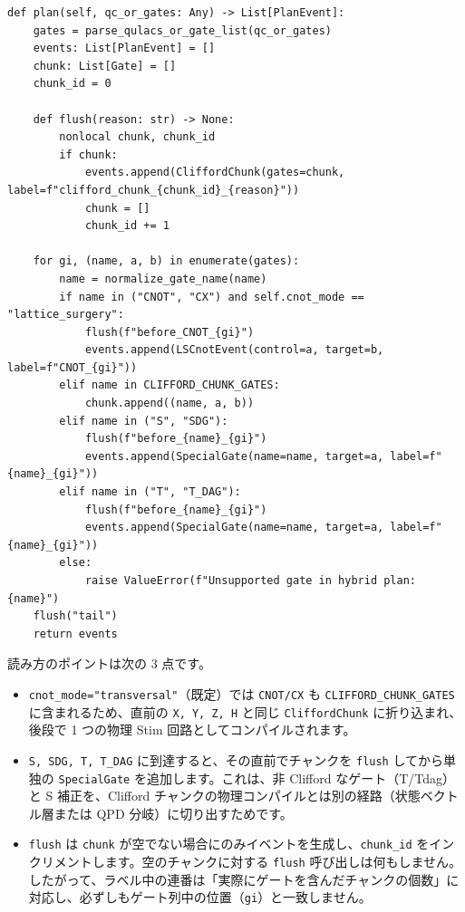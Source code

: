 \begin{lstlisting}[caption={plan メソッド（src/ftqc/hybrid\_ftqc\_runtime.py）}]
def plan(self, qc_or_gates: Any) -> List[PlanEvent]:
    gates = parse_qulacs_or_gate_list(qc_or_gates)
    events: List[PlanEvent] = []
    chunk: List[Gate] = []
    chunk_id = 0

    def flush(reason: str) -> None:
        nonlocal chunk, chunk_id
        if chunk:
            events.append(CliffordChunk(gates=chunk, label=f"clifford_chunk_{chunk_id}_{reason}"))
            chunk = []
            chunk_id += 1

    for gi, (name, a, b) in enumerate(gates):
        name = normalize_gate_name(name)
        if name in ("CNOT", "CX") and self.cnot_mode == "lattice_surgery":
            flush(f"before_CNOT_{gi}")
            events.append(LSCnotEvent(control=a, target=b, label=f"CNOT_{gi}"))
        elif name in CLIFFORD_CHUNK_GATES:
            chunk.append((name, a, b))
        elif name in ("S", "SDG"):
            flush(f"before_{name}_{gi}")
            events.append(SpecialGate(name=name, target=a, label=f"{name}_{gi}"))
        elif name in ("T", "T_DAG"):
            flush(f"before_{name}_{gi}")
            events.append(SpecialGate(name=name, target=a, label=f"{name}_{gi}"))
        else:
            raise ValueError(f"Unsupported gate in hybrid plan: {name}")
    flush("tail")
    return events
\end{lstlisting}

読み方のポイントは次の 3 点です。

\begin{itemize}
  \item \texttt{cnot\_mode="transversal"}（既定）では \texttt{CNOT/CX} も \texttt{CLIFFORD\_CHUNK\_GATES} に含まれるため、直前の \texttt{X, Y, Z, H} と同じ \texttt{CliffordChunk} に折り込まれ、後段で 1 つの物理 Stim 回路としてコンパイルされます。
  \item \texttt{S, SDG, T, T\_DAG} に到達すると、その直前でチャンクを \texttt{flush} してから単独の \texttt{SpecialGate} を追加します。これは、非 Clifford なゲート（T/Tdag）と S 補正を、Clifford チャンクの物理コンパイルとは別の経路（状態ベクトル層または QPD 分岐）に切り出すためです。
  \item \texttt{flush} は \texttt{chunk} が空でない場合にのみイベントを生成し、\texttt{chunk\_id} をインクリメントします。空のチャンクに対する \texttt{flush} 呼び出しは何もしません。したがって、ラベル中の連番は「実際にゲートを含んだチャンクの個数」に対応し、必ずしもゲート列中の位置（\texttt{gi}）と一致しません。
\end{itemize}

